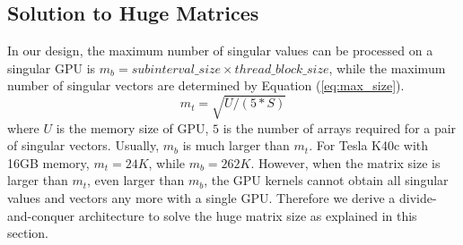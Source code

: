 
\subsection{Solution to Huge Matrices}
\label{sec_huge}
In our design, the maximum number of singular values can be processed on a singular GPU is $m_b = subinterval\_size \times thread\_block\_size$,
while the maximum number of singular vectors are determined by Equation (\ref{eq:max_size}).
\begin{equation}
m_t = \sqrt{U / (5 * S)}
\label{eq:max_size}
\end{equation}
where $U$ is the memory size of GPU, $5$ is the number of arrays required for a pair of singular vectors.
Usually, $m_b$ is much larger than $m_t$.
For Tesla K40c with 16GB memory, $m_t = 24K$, while $m_b = 262K$.
However, when the matrix size is larger than $m_t$, even larger than $m_b$,
the GPU kernels cannot obtain all singular values and vectors any more with a single GPU.
Therefore we derive a divide-and-conquer architecture to solve the huge matrix size as explained in this section.

